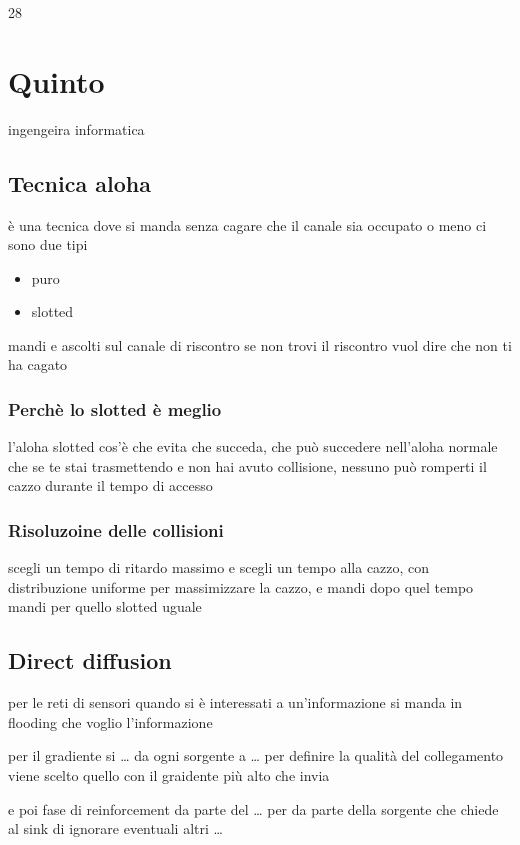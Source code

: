 \documentclass[11pt]{article}
\begin{document}
28

\section{Quinto}
\label{sec:org72aee5f}
ingengeira informatica
\subsection{Tecnica aloha}
\label{sec:orge96dd9c}
è una tecnica dove si manda senza cagare che il canale sia occupato o meno
ci sono due tipi
\begin{itemize}
\item puro
\item slotted
\end{itemize}

mandi e ascolti sul canale di riscontro
se non trovi il riscontro vuol dire che non ti ha cagato

\subsubsection{Perchè lo slotted è meglio}
\label{sec:orgb12b978}
l'aloha slotted cos'è che evita che succeda, che può succedere nell'aloha normale
che se te stai trasmettendo e non hai avuto collisione, nessuno può romperti il cazzo durante il tempo di accesso

\subsubsection{Risoluzoine delle collisioni}
\label{sec:org687176a}
scegli un tempo di ritardo massimo e scegli un tempo alla cazzo, con distribuzione uniforme per massimizzare la cazzo, e mandi dopo quel tempo mandi
per quello slotted uguale

\subsection{Direct diffusion}
\label{sec:orgff5c118}
per le reti di sensori
quando si è interessati a un'informazione si manda in flooding che voglio l'informazione

per il gradiente si \ldots{} da ogni sorgente a \ldots{} per definire la qualità del collegamento
viene scelto quello con il graidente più alto che invia

e poi fase di reinforcement da parte del \ldots{} per da parte della sorgente che chiede al sink di ignorare eventuali altri \ldots{}
\end{document}
